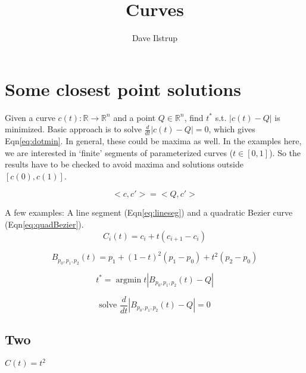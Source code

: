\documentclass[12pt,letterpaper,oneside]{article}
\DeclareMathOperator*{\argmin}{argmin}
\begin{document}
\title{Curves}
\author{Dave Ilstrup}
\date{}
{\sf \maketitle}

\section{Some closest point solutions}

Given a curve $c(t):\mathbb{R}\rightarrow\mathbb{R}^n$
and a point $Q\in\mathbb{R}^n$, find $t^*$ s.t.
$|c(t)-Q|$ is minimized.
Basic approach is to solve $\frac{d}{dt}|c(t)-Q|=0$,
which gives Eqn\ref{eq:dotmin}. In general, these could be maxima
as well. In the examples here, we are interested in `finite' segments 
of parameterized curves ($t\in[0,1]$). So the results have to be checked
to avoid maxima and solutions outside $[c(0),c(1)]$.

\begin{equation}
\label{eq:dotmin}
<c,c'>=<Q,c'>
\end{equation}


A few examples: A line segment (Eqn\ref{eq:lineseg})
and a quadratic Bezier curve (Eqn\ref{eq:quadBezier}).
\begin{equation}
\label{eq:lineseg}
C_i(t) = c_i + t (c_{i+1}-c_i)
\end{equation}

\begin{equation}
\label{eq:quadBezier}
B_{p_0,p_1,p_2}(t) = p_1 + (1-t)^2(p_1-p_0) + t^2 (p_2-p_0)
\end{equation}


\begin{equation}
t^* = \argmin{t} |B_{p_0,p_1,p_2}(t)-Q|
\end{equation}

\begin{equation}
\textrm{solve }
\frac{d}{dt} |B_{p_0,p_1,p_2}(t)-Q|=0
\end{equation}


\subsection{Two}

$C(t)=t^2$
\end{document}

